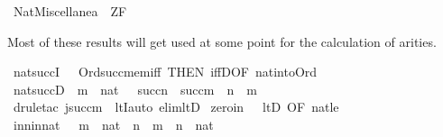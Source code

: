 %
\begin{isabellebody}%
%
%
\isadelimdocument
%
\endisadelimdocument
%
\isatagdocument
%
\isamarkuptrue%
%
\endisatagdocument
{\isafolddocument}%
%
\isadelimdocument
%
\endisadelimdocument
%
\isadelimtheory
%
\endisadelimtheory
%
\isatagtheory
{}\isamarkupfalse%
\ Nat{\isacharunderscore}{\kern0pt}Miscellanea\ \ ZF\ %
\endisatagtheory
{\isafoldtheory}%
%
\isadelimtheory
%
\endisadelimtheory
%
\begin{isamarkuptext}%
Most of these results will get used at some point for the
calculation of arities.%
\end{isamarkuptext}\isamarkuptrue%
\isamarkupfalse%
\ nat{\isacharunderscore}{\kern0pt}succI\ {\isacharequal}{\kern0pt}\ \ Ord{\isacharunderscore}{\kern0pt}succ{\isacharunderscore}{\kern0pt}mem{\isacharunderscore}{\kern0pt}iff\ {\isacharbrackleft}{\kern0pt}THEN\ iffD{}{\isacharcomma}{\kern0pt}OF\ nat{\isacharunderscore}{\kern0pt}into{\isacharunderscore}{\kern0pt}Ord{\isacharbrackright}{\kern0pt}\isanewline
\isanewline
{}\isamarkupfalse%
\ nat{\isacharunderscore}{\kern0pt}succD\ {\isacharcolon}{\kern0pt}\ {\isachardoublequoteopen}m\ {\isasymin}\ nat\ {\isasymLongrightarrow}\ \ succ{\isacharparenleft}{\kern0pt}n{\isacharparenright}{\kern0pt}\ {\isasymin}\ succ{\isacharparenleft}{\kern0pt}m{\isacharparenright}{\kern0pt}\ {\isasymLongrightarrow}\ n\ {\isasymin}\ m{\isachardoublequoteclose}\isanewline
%
\isadelimproof
\ \ %
\endisadelimproof
%
\isatagproof
{}\isamarkupfalse%
\ {\isacharparenleft}{\kern0pt}drule{\isacharunderscore}{\kern0pt}tac\ j{\isacharequal}{\kern0pt}{\isachardoublequoteopen}succ{\isacharparenleft}{\kern0pt}m{\isacharparenright}{\kern0pt}{\isachardoublequoteclose}\ \ ltI{\isacharcomma}{\kern0pt}auto\ elim{\isacharcolon}{\kern0pt}ltD{\isacharparenright}{\kern0pt}%
\endisatagproof
{\isafoldproof}%
%
\isadelimproof
\isanewline
%
\endisadelimproof
\isanewline
{}\isamarkupfalse%
\ zero{\isacharunderscore}{\kern0pt}in\ {\isacharequal}{\kern0pt}\ \ ltD\ {\isacharbrackleft}{\kern0pt}OF\ nat{\isacharunderscore}{\kern0pt}{}{\isacharunderscore}{\kern0pt}le{\isacharbrackright}{\kern0pt}\isanewline
\isanewline
{}\isamarkupfalse%
\ in{\isacharunderscore}{\kern0pt}n{\isacharunderscore}{\kern0pt}in{\isacharunderscore}{\kern0pt}nat\ {\isacharcolon}{\kern0pt}\ \ {\isachardoublequoteopen}m\ {\isasymin}\ nat\ {\isasymLongrightarrow}\ n\ {\isasymin}\ m\ {\isasymLongrightarrow}\ n\ {\isasymin}\ nat{\isachardoublequoteclose}\isanewline

\end{isabellebody}
